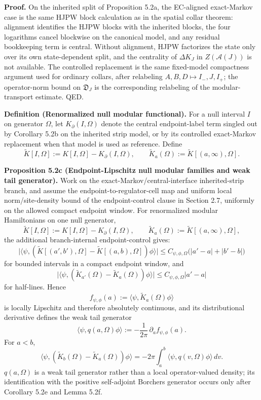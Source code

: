 \textbf{Proof.} On the inherited split of Proposition 5.2a, the EC-aligned exact-Markov case is the same HJPW block calculation as in the spatial collar theorem: alignment identifies the HJPW blocks with the inherited blocks, the four logarithms cancel blockwise on the canonical model, and any residual bookkeeping term is central. Without alignment, HJPW factorizes the state only over its own state-dependent split, and the centrality of \(\Delta K_J\) in \(Z(\mathcal A(J))\) is not available. The controlled replacement is the same fixed-model compactness argument used for ordinary collars, after relabeling \(A,B,D\mapsto I_-,J,I_+\); the operator-norm bound on \(\mathfrak D_J\) is the corresponding relabeling of the modular-transport estimate. QED.

\textbf{Definition (Renormalized null modular functional).} For a null interval \(I\) on generator \(\Omega\), let \(K_\partial(I,\Omega)\) denote the central endpoint-label term singled out by Corollary 5.2b on the inherited strip model, or by its controlled exact-Markov replacement when that model is used as reference. Define
\[
\widetilde K[I,\Omega]
:=
K[I,\Omega]-K_\partial(I,\Omega),
\qquad
\widetilde K_a(\Omega):=\widetilde K[(a,\infty),\Omega].
\]

\textbf{Proposition 5.2c (Endpoint-Lipschitz null modular families and weak tail generator).} Work on the exact-Markov/central-interface inherited-strip branch, and assume the endpoint-to-regulator-cell map and uniform local norm/site-density bound of the endpoint-control clause in Section 2.7, uniformly on the allowed compact endpoint window. For renormalized modular Hamiltonians on one null generator,
\[
\widetilde K[I,\Omega]
:=
K[I,\Omega]-K_\partial(I,\Omega),
\qquad
\widetilde K_a(\Omega):=\widetilde K[(a,\infty),\Omega],
\]
the additional branch-internal endpoint-control gives:
\[
\bigl|
\langle\psi,(\widetilde K[(a',b'),\Omega]-\widetilde K[(a,b),\Omega])\phi\rangle
\bigr|
\le
C_{\psi,\phi,\Omega}\bigl(|a'-a|+|b'-b|\bigr)
\]
for bounded intervals in a compact endpoint window, and
\[
\bigl|
\langle\psi,(\widetilde K_{a'}(\Omega)-\widetilde K_a(\Omega))\phi\rangle
\bigr|
\le
C_{\psi,\phi,\Omega}|a'-a|
\]
for half-lines. Hence
\[
f_{\psi,\phi}(a):=\langle\psi,\widetilde K_a(\Omega)\phi\rangle
\]
is locally Lipschitz and therefore absolutely continuous, and its distributional derivative defines the weak tail generator
\[
\langle\psi,q(a,\Omega)\phi\rangle
:=
-\frac{1}{2\pi}\,\partial_a f_{\psi,\phi}(a).
\]
For \(a<b\),
\[
\langle\psi,(\widetilde K_b(\Omega)-\widetilde K_a(\Omega))\phi\rangle
=
-2\pi\int_a^b \langle\psi,q(v,\Omega)\phi\rangle\,dv.
\]
\(q(a,\Omega)\) is a weak tail generator rather than a local operator-valued density; its identification with the positive self-adjoint Borchers generator occurs only after Corollary 5.2e and Lemma 5.2f.

